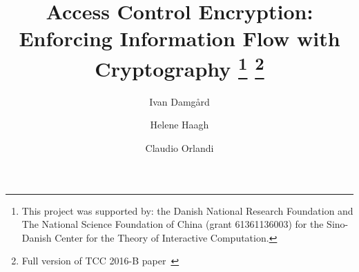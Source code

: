 \documentclass{llncs}
\title{Access Control Encryption: \\ Enforcing Information Flow with Cryptography
\thanks{This project was supported by: the Danish National Research Foundation and The National Science Foundation of China (grant 61361136003) for the Sino-Danish Center for the Theory of Interactive Computation.}
\thanks{Full version of TCC 2016-B paper~\cite{ACE-TCC2016B}}}
\author{Ivan Damg{\aa}rd \and Helene Haagh \and Claudio Orlandi}
\institute{\{ivan,haagh,orlandi\}@cs.au.dk, Aarhus University}
\begin{document}
\maketitle
\newcommand{\todo}[1]{\textcolor{red}{(TODO: #1)}}
\newcommand{\hfh}[1]{\textcolor{green}{(Helene: #1)}}
\newcommand{\cnote}[1]{\textcolor{blue}{(Claudio: #1)}}

\newcommand{\from}{\leftarrow}
\newcommand{\zo}{\{0,1\}}
\newcommand{\zon}{\{0,1\}^n}
\newcommand{\zok}{\{0,1\}^\kappa}

\newcommand{\RR}{\mathbb{R}}
\newcommand{\NN}{\mathbb{N}}
\newcommand{\San}{\mathsf{San}}
\newcommand{\negl}{\mathsf{negl}}

\newtheorem{construction}{Construction}



\newcommand{\Setup}{\mathsf{Setup}}
\newcommand{\Gen}{\mathsf{Gen}}
\newcommand{\Enc}{\mathsf{Enc}}
\newcommand{\Dec}{\mathsf{Dec}}
\newcommand{\randDec}{\mathsf{RDec}}
\newcommand{\Prove}{\mathsf{Prove}}
\newcommand{\Verify}{\mathsf{Verify}}
\newcommand{\M}{\mathcal{M}}
\newcommand{\sen}{\mathsf{sen}}
\newcommand{\rec}{\mathsf{rec}}
\newcommand{\san}{\mathsf{san}}
\newcommand{\C}{\mathcal{C}}
\newcommand{\Sim}{\mathsf{Sim}}

\newcommand{\Rand}{\San}
\newcommand{\PKE}{\mathsf{PKE}}
\newcommand{\secparam}{\kappa}
\newcommand{\ACE}{\mathsf{ACE}}

\newcommand{\desc}{\textup{desc}}

\newcommand{\oACE}{$1$-ACE\xspace}

\newcommand{\oneACE}{\mathsf{1ACE}}
\newcommand{\oneACEpow}{\mathsf{1ACE}}
\newcommand{\EGACE}{\mathsf{EGACE}}

\newcommand{\CCG}{\mathsf{Challenge}}


\newcommand{\sanFE}{\mathsf{sFE}}
\newcommand{\sanFEpow}{\mathsf{sFE}}
\newcommand{\sanPKE}{\mathsf{sPKE}}
\newcommand{\NIZK}{\mathsf{NIZK}}
\newcommand{\PRF}{\mathsf{PRF}}

\newcommand{\R}{\mathcal{R}}
\newcommand{\MasterDec}{\mathsf{MDec}}
\newcommand{\adv}[1]{\mathsf{adv}^{#1}} 

\newcommand{\sssprob}{p_{sss}}

\renewenvironment{claim}{
	\refstepcounter{claimcounter}
	\medskip
	\noindent \textit{Claim~\arabic{claimcounter}}. \enskip
}{

}
\end{document}
